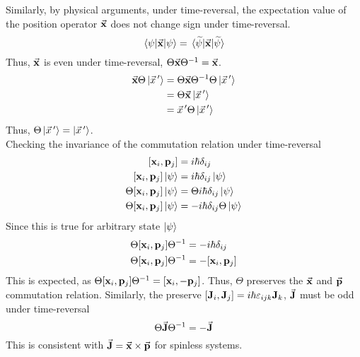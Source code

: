 \documentclass[12pt,a4paper,titlepage]{article}
\begin{document}
Similarly, by physical arguments, under time-reversal, the expectation value of the position operator $\vec{\vb{x}}$ does not change sign under time-reversal.
\begin{equation}
\mel{\psi}{\vec{\vb{x}}}{\psi}=\mel*{\widetilde{\psi}}{\vec{\vb{x}}}{\widetilde{\psi}}
\end{equation}
Thus, $\vec{\vb{x}}$ is even under time-reversal, $\Theta\vec{\vb{x}}\Theta^{-1}=\vec{\vb{x}}$.
\begin{equation}
\begin{aligned}
\vec{\vb{x}}\Theta\ket{\vec{x}\,'}&=\Theta\vec{\vb{x}}\Theta^{-1}\Theta\ket{\vec{x}\,'}\\
&=\Theta\vec{\vb{x}}\ket{\vec{x}\,'}\\
&=\vec{x}\,'\Theta\ket{\vec{x}\,'}
\end{aligned}
\end{equation}
Thus, $\Theta\ket{\vec{x}\,'}=\ket{\vec{x}\,'}$.\\

Checking the invariance of the commutation relation under time-reversal
\begin{equation}
\begin{aligned}
\comm{\vb{x}_{i}}{\vb{p}_{j}}&=i\hbar\delta_{ij}\\
\comm{\vb{x}_{i}}{\vb{p}_{j}}\ket{\psi}&=i\hbar\delta_{ij}\ket{\psi}\\
\Theta\comm{\vb{x}_{i}}{\vb{p}_{j}}\ket{\psi}&=\Theta i\hbar\delta_{ij}\ket{\psi}\\
\Theta\comm{\vb{x}_{i}}{\vb{p}_{j}}\ket{\psi}&=-i\hbar\delta_{ij}\Theta\ket{\psi}
\end{aligned}
\end{equation}
Since this is true for arbitrary state $\ket{\psi}$
\begin{equation}
\begin{aligned}
\Theta\comm{\vb{x}_{i}}{\vb{p}_{j}}\Theta^{-1}&=-i\hbar\delta_{ij}\\
\Theta\comm{\vb{x}_{i}}{\vb{p}_{j}}\Theta^{-1}&=-\comm{\vb{x}_{i}}{\vb{p}_{j}}
\end{aligned}
\end{equation}
This is expected, as $\Theta\comm{\vb{x}_{i}}{\vb{p}_{j}}\Theta^{-1}=\comm{\vb{x}_{i}}{-\vb{p}_{j}}$. Thus, $\Theta$ preserves the $\vec{\vb{x}}$ and $\vec{\vb{p}}$ commutation relation. Similarly, the preserve $\comm{\vb{J}_{i}}{\vb{J}_{j}}=i\hbar\varepsilon_{ijk}\vb{J}_{k}$, $\vec{\vb{J}}$ must be odd under time-reversal
\begin{equation}
\Theta\vec{\vb{J}}\Theta^{-1}=-\vec{\vb{J}}
\end{equation}
This is consistent with $\vec{\vb{J}}=\vec{\vb{x}}\times\vec{\vb{p}}$ for spinless systems.\\
\end{document}
